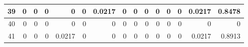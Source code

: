 \begin{table}[hb!]
\begin{adjustbox}{width = \textwidth, center}
\begin{tabular}{|c|r|r|r|r|r|r|r|r|r|r|r|r|r|r|}
        \rowcolor[HTML]{FFFFFF} 
        \cellcolor[HTML]{CFE2F3}39                                  & 0                                              & 0                                              & 0                                              & 0                                              & 0                                              & \cellcolor[HTML]{C7E9D8}0.0217                 & 0                                              & 0                                               & 0                                               & 0                                               & 0                                               & 0                                               & \cellcolor[HTML]{D9D2E9}0.0217                                                  & \cellcolor[HTML]{D9D2E9}0.8478                                                        \\ \hline
        \rowcolor[HTML]{FFFFFF} 
        \cellcolor[HTML]{CFE2F3}40                                  & 0                                              & 0                                              & 0                                              & 0                                              & 0                                              & 0                                              & 0                                              & 0                                               & 0                                               & 0                                               & 0                                               & 0                                               & \cellcolor[HTML]{D9D2E9}0                                                       & \cellcolor[HTML]{D9D2E9}0                                                             \\ \hline
        \rowcolor[HTML]{FFFFFF} 
        \cellcolor[HTML]{CFE2F3}41                                  & 0                                              & 0                                              & 0                                              & \cellcolor[HTML]{C7E9D8}0.0217                 & 0                                              & 0                                              & 0                                              & 0                                               & 0                                               & 0                                               & 0                                               & 0                                               & \cellcolor[HTML]{D9D2E9}0.0217                                                  & \cellcolor[HTML]{D9D2E9}0.8913                                                        \\ \hline

\end{tabular}
\end{adjustbox}
\end{table}

